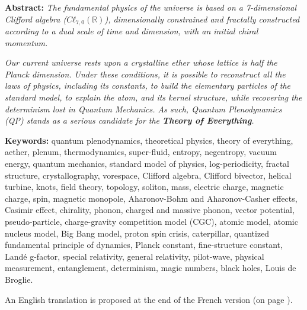 \documentclass[11pt,a4paper,onecolumn,twoside]{article}
\begin{document}
	
	\begin{center}	
		\begin{minipage}{0.8\textwidth}		
			{\textbf{Abstract:}}
			\textit{The fundamental physics of the universe is based on a 7-dimensional
				Clifford algebra ($Cℓ_{7,0}(\mathbb{R})$), dimensionally constrained and fractally
				constructed according to a dual scale of time and dimension, with an initial
				chiral momentum.}
			
			\vskip 3pt
			
			\textit{Our current universe rests upon a crystalline ether whose lattice is half the Planck dimension. Under these conditions, it is possible to reconstruct all the laws of physics, including its constants, to build the elementary particles of the standard model, to explain the atom, and its kernel structure, while recovering the determinism lost in Quantum Mechanics. As such, Quantum Plenodynamics (QP) stands as a serious candidate for the \textbf{Theory of Everything}.}
			
			\vspace*{0.25cm}
			{ \textbf{Keywords:} quantum plenodynamics, theoretical physics, theory of everything, aether, plenum, thermodynamics, super-fluid, entropy, negentropy, vacuum energy, quantum mechanics, standard model of physics, log-periodicity, fractal structure, crystallography, vorespace, Clifford algebra, Clifford bivector, helical turbine, knots, field theory, topology, soliton, mass, electric charge, magnetic charge, spin, magnetic monopole, Aharonov-Bohm and Aharonov-Casher effects, Casimir effect, chirality, phonon, charged and massive phonon, vector potential, pseudo-particle, charge-gravity competition model (CGC), atomic model, atomic nucleus model, Big Bang model, proton spin crisis, caterpillar, quantized fundamental principle of dynamics, Planck constant, fine-structure constant, Landé g-factor, special relativity, general relativity, pilot-wave, physical measurement, entanglement, determinism, magic numbers, black holes, Louis de Broglie.
				}
			
			\vspace*{0.25cm}
			
		\end{minipage}
	\end{center}
	\begin{center}
			An English translation is proposed at the end of the French version (on page \pageref{English}).
	\end{center}
	
	\vspace*{0.5cm}
	
	
	
	\clearpage

	\label{English}
	
	
	
\end{document}
